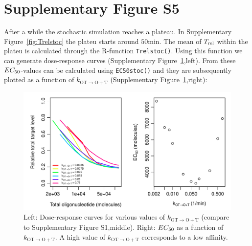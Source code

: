 \documentclass[a4paper,11pt]{article}
\newenvironment{Ncenter}{%
  \setlength\topsep{-10pt}
  \setlength\parskip{-100pt}
  \begin{center}
}{%
  \end{center}
}
\newcommand{\kmo}{k_{\mathrm{OT \to O+T}}}
\newcommand{\Trel}{T_{\rm{rel}}}
\newcommand{\EC}{EC_{\rm{50}}}
\begin{document}
\section{Supplementary Figure S5}
After a while the stochastic simulation reaches a plateau. In Supplementary Figure~\ref{fig:Trelstoc} the plateu starts around $50$min. The mean of $\Trel$ within the plateu is calculated through the R-function \texttt{Trelstoc()}. Using this function we can generate dose-response curves (Supplementary Figure~\ref{fig:stocEC50},left). From these $\EC$-values can be calculated using \texttt{EC50stoc()} and they are subsequently plotted as a function of $\kmo$ (Supplementary Figure~\ref{fig:stocEC50},right):
\begin{Schunk}
\end{Schunk}
\begin{figure}[!h]
\begin{Ncenter}
\includegraphics[width=\textwidth]{SuppFile1-EC50.pdf}
\end{Ncenter}
\caption{Left: Dose-response curves for various values of $\kmo$ (compare to Supplementary Figure S1,middle). Right: $\EC$ as a function of $\kmo$. A high value of $\kmo$ corresponds to a low affinity.}\label{fig:stocEC50}
\end{figure}
\newpage
\end{document}
